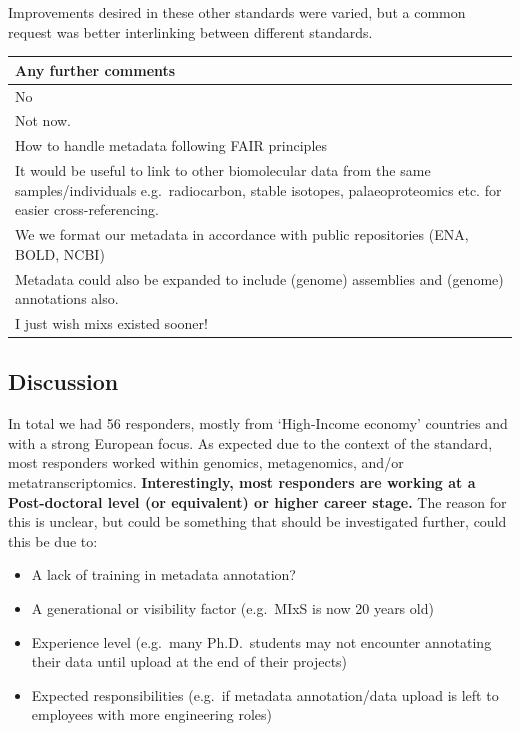 \documentclass[
  letterpaper,
  DIV=11,
  numbers=noendperiod]{scrartcl}
\newcounter{none} %
\providecommand{\tightlist}{%
  \setlength{\itemsep}{0pt}\setlength{\parskip}{0pt}}
\begin{document}
Improvements desired in these other standards were varied, but a common
request was better interlinking between different standards.

{\def\LTcaptype{none} %
\begin{longtable}[]{@{}
  >{\raggedright\arraybackslash}p{}@{}}
\toprule\noalign{}
\begin{minipage}[b]{\linewidth}\raggedright
Any further comments
\end{minipage} \\
\midrule\noalign{}
\endhead
\bottomrule\noalign{}
\endlastfoot
No \\
Not now. \\
How to handle metadata following FAIR principles \\
It would be useful to link to other biomolecular data from the same
samples/individuals e.g.~radiocarbon, stable isotopes, palaeoproteomics
etc. for easier cross-referencing. \\
We we format our metadata in accordance with public repositories (ENA,
BOLD, NCBI) \\
Metadata could also be expanded to include (genome) assemblies and
(genome) annotations also. \\
I just wish mixs existed sooner! \\
\end{longtable}
}

\subsection{Discussion}\label{discussion}

In total we had 56 responders, mostly from `High-Income economy'
countries and with a strong European focus. As expected due to the
context of the standard, most responders worked within genomics,
metagenomics, and/or metatranscriptomics. \textbf{Interestingly, most
responders are working at a Post-doctoral level (or equivalent) or
higher career stage.} The reason for this is unclear, but could be
something that should be investigated further, could this be due to:

\begin{itemize}
\tightlist
\item
  A lack of training in metadata annotation?
\item
  A generational or visibility factor (e.g.~MIxS is now 20 years old)
\item
  Experience level (e.g.~many Ph.D.~students may not encounter
  annotating their data until upload at the end of their projects)
\item
  Expected responsibilities (e.g.~if metadata annotation/data upload is
  left to employees with more engineering roles)
\end{itemize}
\end{document}
